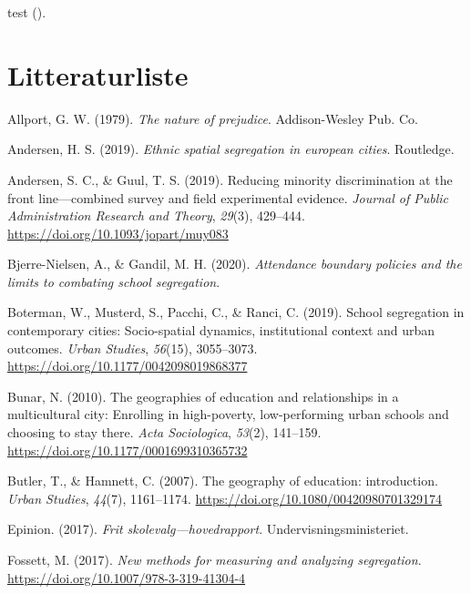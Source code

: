 \documentclass[
]{book}
\newlength{\cslhangindent}
\newenvironment{CSLReferences}[2] %
 {\begin{list}{}{%
  \setlength{\itemindent}{0pt}
  \setlength{\leftmargin}{0pt}
  \setlength{\parsep}{0pt}
  \ifodd #1
   \setlength{\leftmargin}{\cslhangindent}
   \setlength{\itemindent}{-1\cslhangindent}
  \fi
  \setlength{\itemsep}{#2\baselineskip}}}
 {\end{list}}
\begin{document}
test ().

\chapter*{Litteraturliste}\label{litteraturliste}

\label{refs}
\begin{CSLReferences}{1}{0}
Allport, G. W. (1979). \emph{The nature of prejudice}. Addison-Wesley Pub. Co.

Andersen, H. S. (2019). \emph{Ethnic spatial segregation in european cities}. Routledge.

Andersen, S. C., \& Guul, T. S. (2019). Reducing minority discrimination at the front line---combined survey and field experimental evidence. \emph{Journal of Public Administration Research and Theory}, \emph{29}(3), 429--444. \url{https://doi.org/10.1093/jopart/muy083}

Bjerre-Nielsen, A., \& Gandil, M. H. (2020). \emph{Attendance boundary policies and the limits to combating school segregation}.

Boterman, W., Musterd, S., Pacchi, C., \& Ranci, C. (2019). School segregation in contemporary cities: Socio-spatial dynamics, institutional context and urban outcomes. \emph{Urban Studies}, \emph{56}(15), 3055--3073. \url{https://doi.org/10.1177/0042098019868377}

Bunar, N. (2010). The geographies of education and relationships in a multicultural city: Enrolling in high-poverty, low-performing urban schools and choosing to stay there. \emph{Acta Sociologica}, \emph{53}(2), 141--159. \url{https://doi.org/10.1177/0001699310365732}

Butler, T., \& Hamnett, C. (2007). The geography of education: introduction. \emph{Urban Studies}, \emph{44}(7), 1161--1174. \url{https://doi.org/10.1080/00420980701329174}

Epinion. (2017). \emph{Frit skolevalg---hovedrapport}. Undervisningsministeriet.

Fossett, M. (2017). \emph{New methods for measuring and analyzing segregation}. \url{https://doi.org/10.1007/978-3-319-41304-4}


\end{CSLReferences}
\end{document}
